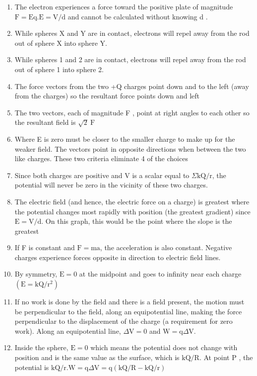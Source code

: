 \begin{enumerate}
\begin{enumerate}
  \item The electron experiences a force toward the positive plate of magnitude $\mathrm{F}=\mathrm{Eq} . \mathrm{E}=\mathrm{V} / \mathrm{d}$ and cannot be calculated without knowing d .
  \item While spheres X and Y are in contact, electrons will repel away from the rod out of sphere X into sphere Y.
  \item While spheres 1 and 2 are in contact, electrons will repel away from the rod out of sphere 1 into sphere 2.
  \item The force vectors from the two +Q charges point down and to the left (away from the charges) so the resultant force points down and left
  \item The two vectors, each of magnitude F , point at right angles to each other so the resultant field is $\sqrt{2} \mathrm{~F}$
  \item Where E is zero must be closer to the smaller charge to make up for the weaker field. The vectors point in opposite directions when between the two like charges. These two criteria eliminate 4 of the choices
  \item Since both charges are positive and V is a scalar equal to $\Sigma \mathrm{kQ} / \mathrm{r}$, the potential will never be zero in the vicinity of these two charges.
  \item The electric field (and hence, the electric force on a charge) is greatest where the potential changes most rapidly with position (the greatest gradient) since $\mathrm{E}=\mathrm{V} / \mathrm{d}$. On this graph, this would be the point where the slope is the greatest
  \item If F is constant and $\mathrm{F}=\mathrm{ma}$, the acceleration is also constant. Negative charges experience forces opposite in direction to electric field lines.
  \item By symmetry, $\mathrm{E}=0$ at the midpoint and goes to infinity near each charge $\left(\mathrm{E}=\mathrm{kQ} / \mathrm{r}^{2}\right)$
  \item If no work is done by the field and there is a field present, the motion must be perpendicular to the field, along an equipotential line, making the force perpendicular to the displacement of the charge (a requirement for zero work). Along an equipotential line, $\Delta \mathrm{V}=0$ and $\mathrm{W}=\mathrm{q} \Delta \mathrm{V}$.
  \item Inside the sphere, $\mathrm{E}=0$ which means the potential does not change with position and is the same value as the surface, which is $\mathrm{kQ} / \mathrm{R}$. At point P , the potential is $\mathrm{kQ} / \mathrm{r} . \mathrm{W}=\mathrm{q} \Delta \mathrm{V}=\mathrm{q}(\mathrm{kQ} / \mathrm{R}-\mathrm{kQ} / \mathrm{r})$

\end{enumerate}
\end{enumerate}
